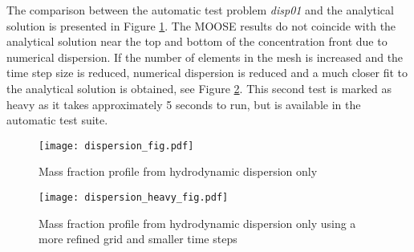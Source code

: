 \documentclass[]{report}
\begin{document}
The comparison between the automatic test problem \emph{disp01} and the analytical solution is presented in Figure \ref{fig:disp}. The MOOSE results do not coincide with the analytical solution near the top and bottom of the concentration front due to numerical dispersion. If the number of elements in the mesh is increased and the time step size is reduced, numerical dispersion is reduced and a much closer fit to the analytical solution is obtained, see Figure \ref{fig:dispheavy}. This second test is marked as heavy as it takes approximately 5 seconds to run, but is available in the automatic test suite.
\begin{figure}[htb]
\centering
\texttt{[image: dispersion\_fig.pdf]}
\caption{Mass fraction profile from hydrodynamic dispersion only}
\label{fig:disp}
\end{figure}

\begin{figure}[htb]
\centering
\texttt{[image: dispersion\_heavy\_fig.pdf]}
\caption{Mass fraction profile from hydrodynamic dispersion only using a more refined grid and smaller time steps}
\label{fig:dispheavy}
\end{figure}
\end{document}

